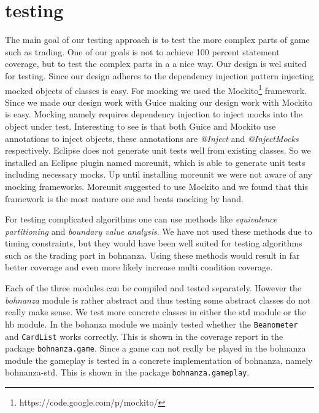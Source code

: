 \section{testing}
The main goal of our testing approach is to test the more complex parts of game such as
trading. One of our goals is not to achieve 100 percent statement coverage, but to test the complex parts
in a a nice way. Our design is wel suited for testing. Since our design adheres to the dependency injection pattern
injecting mocked objects of classes is easy. For mocking we used the Mockito\footnote{https://code.google.com/p/mockito/} framework. Since
we made our design work with Guice making our design work with Mockito is easy. Mocking namely requires dependency injection to inject
mocks into the object under test. Interesting to see is that both Guice and Mockito use annotations to inject objects, these annotations are
\emph{@Inject} and \emph{@InjectMocks} respectively. Eclipse does not generate unit tests well from existing classes. So we installed an
Eclipse plugin named moreunit, which is able to generate unit tests including necessary mocks. Up until installing moreunit we were not
aware of any mocking frameworks. Moreunit suggested to use Mockito and we found that this framework is the most mature one and beats
mocking by hand.

For testing complicated algorithms one can use methods like \emph{equivalence partitioning} and \emph{boundary value analysis}. We have not
used these methods due to timing constraints, but they would have been well suited for testing algorithms such as the trading part in
bohnanza. Using these methods would result in far better coverage and even more likely increase multi condition coverage.

Each of the three modules can be compiled and tested separately.
However the \emph{bohnanza} module is rather abstract and thus testing some abstract classes do not really make sense. We test
more concrete classes in either the \gls{std} module or the \gls{hb} module.
In the bohanza module we mainly tested whether the \texttt{Beanometer} and \texttt{CardList}
works correctly. This is shown in the coverage report in the package \texttt{bohnanza.game}. Since a
game can not really be played in the bohnanza module the gameplay is tested in a concrete
implementation of bohnanza, namely bohnanza-std. This is shown in the package
\texttt{bohnanza.gameplay}.


